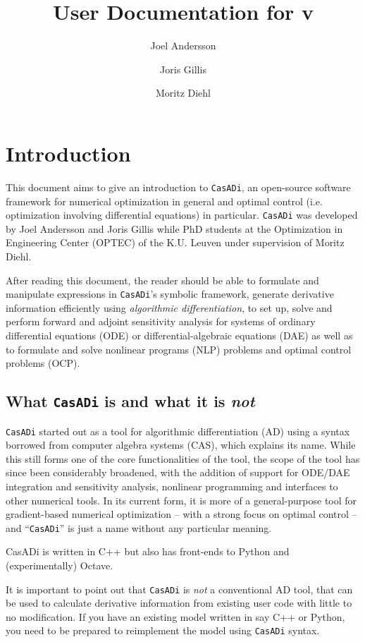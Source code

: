 \documentclass[a4paper,12pt]{book}
\author{Joel Andersson \and Joris Gillis \and Moritz Diehl}
\title{User Documentation for \CasADi v\currentversion}
\newcommand{\CasADi}{\texttt{CasADi}\xspace}
\begin{document}
\titlepage
\maketitle
\begin{latexonly}
\tableofcontents
\end{latexonly}
\clearpage

\chapter{Introduction}
This document aims to give an introduction to \CasADi, an open-source software framework for numerical optimization in general and optimal control (i.e. optimization involving differential equations) in particular. \CasADi was developed by Joel Andersson and Joris Gillis while PhD students at the Optimization in Engineering Center (OPTEC) of the K.U. Leuven under supervision of Moritz Diehl.

After reading this document, the reader should be able to formulate and manipulate expressions in \CasADi's symbolic framework, generate derivative information efficiently using \emph{algorithmic differentiation}, to set up, solve and perform forward and adjoint sensitivity analysis for systems of ordinary differential equations (ODE) or differential-algebraic equations (DAE) as well as to formulate and solve nonlinear programs (NLP) problems and optimal control problems (OCP).

\section{What \CasADi is and what it is \emph{not}}
\CasADi started out as a tool for algorithmic differentiation (AD) using a syntax borrowed from computer algebra systems (CAS), which explains its name. While this still forms one of the core functionalities of the tool, the scope of the tool has since been considerably broadened, with the addition of support for ODE/DAE integration and sensitivity analysis, nonlinear programming and interfaces to other numerical tools. In its current form, it is more of a general-purpose tool for gradient-based numerical optimization -- with a strong focus on optimal control -- and ``\CasADi'' is just a name without any particular meaning.

CasADi is written in C++ but also has front-ends to Python and (experimentally) Octave.

It is important to point out that \CasADi is \emph{not} a conventional AD tool, that can be used to calculate derivative information from existing user code with little to no modification. If you have an existing model written in say C++ or Python, you need to be prepared to reimplement the model using \CasADi syntax.
\end{document}
